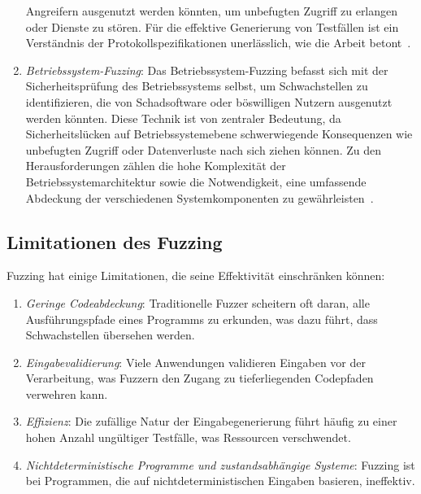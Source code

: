 \begin{enumerate}
    Angreifern ausgenutzt werden könnten, um unbefugten Zugriff zu erlangen oder Dienste zu stören.
    Für die effektive Generierung von Testfällen ist ein Verständnis der Protokollspezifikationen unerlässlich, wie die Arbeit
    betont~\cite{eceiza_fuzzing_2021}.
    \item \textit{Betriebssystem-Fuzzing}: Das Betriebssystem-Fuzzing befasst sich mit der Sicherheitsprüfung des Betriebssystems selbst, um Schwachstellen zu identifizieren,
    die von Schadsoftware oder böswilligen Nutzern ausgenutzt werden könnten.
    Diese Technik ist von zentraler Bedeutung, da Sicherheitslücken auf Betriebssystemebene schwerwiegende Konsequenzen wie
    unbefugten Zugriff oder Datenverluste nach sich ziehen können.
    Zu den Herausforderungen zählen die hohe Komplexität der Betriebssystemarchitektur sowie die Notwendigkeit, eine umfassende
    Abdeckung der verschiedenen Systemkomponenten zu gewährleisten~\cite{eceiza_fuzzing_2021}.
\end{enumerate}
\subsection{Limitationen des Fuzzing}\label{subsec:limitationen-des-fuzzign}
Fuzzing hat einige Limitationen, die seine Effektivität einschränken können:
\begin{enumerate}
    \item \textit{Geringe Codeabdeckung}: Traditionelle Fuzzer scheitern oft daran, alle Ausführungspfade eines Programms zu
    erkunden, was dazu führt, dass Schwachstellen übersehen werden.
    \item \textit{Eingabevalidierung}: Viele Anwendungen validieren Eingaben vor der Verarbeitung, was Fuzzern den Zugang zu
    tieferliegenden Codepfaden verwehren kann.
    \item \textit{Effizienz}: Die zufällige Natur der Eingabegenerierung führt häufig zu einer hohen Anzahl ungültiger Testfälle,
    was Ressourcen verschwendet.
    \item \textit{Nichtdeterministische Programme und zustandsabhängige Systeme}: Fuzzing ist bei Programmen, die auf
    nichtdeterministischen Eingaben basieren, ineffektiv.

\end{enumerate}

